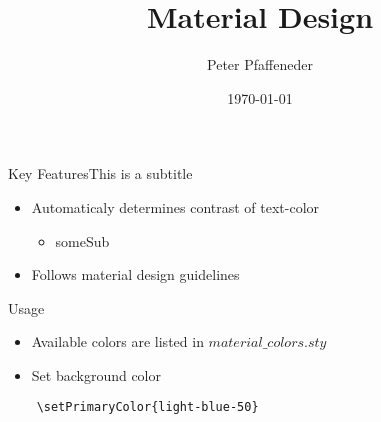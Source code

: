 \documentclass{beamer}
\title{Material Design}
\date{\today}
\author{Peter Pfaffeneder}
\begin{document}
\begin{frame}
	\titlepage
\end{frame}

\begin{frame}{Key Features}{This is a subtitle}

	\begin{itemize}
		\item Automaticaly determines contrast of text-color
		\begin{itemize}
			\item someSub
		\end{itemize}
		\item Follows material design guidelines
	\end{itemize}
\end{frame}

\begin{frame}{Usage}
	\begin{itemize}
		\item Available colors are listed in $material\_colors.sty$
		\item Set background color
	\end{itemize}
\end{frame}


\begin{verbatim}
	\setPrimaryColor{light-blue-50}
\end{verbatim}
\end{document}
